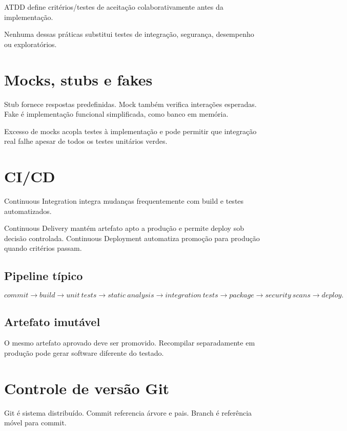ATDD define critérios/testes de aceitação colaborativamente antes da implementação.

Nenhuma dessas práticas substitui testes de integração, segurança, desempenho ou exploratórios.

\section{Mocks, stubs e fakes}

Stub fornece respostas predefinidas. Mock também verifica interações esperadas. Fake é implementação funcional simplificada, como banco em memória.

Excesso de mocks acopla testes à implementação e pode permitir que integração real falhe apesar de todos os testes unitários verdes.

\section{CI/CD}

Continuous Integration integra mudanças frequentemente com build e testes automatizados.

Continuous Delivery mantém artefato apto a produção e permite deploy sob decisão controlada. Continuous Deployment automatiza promoção para produção quando critérios passam.

\subsection{Pipeline típico}

\[
commit\rightarrow build\rightarrow unit\ tests\rightarrow static\ analysis\rightarrow integration\ tests\rightarrow package\rightarrow security\ scans\rightarrow deploy.
\]

\subsection{Artefato imutável}

O mesmo artefato aprovado deve ser promovido. Recompilar separadamente em produção pode gerar software diferente do testado.

\section{Controle de versão Git}

Git é sistema distribuído. Commit referencia árvore e pais. Branch é referência móvel para commit.

